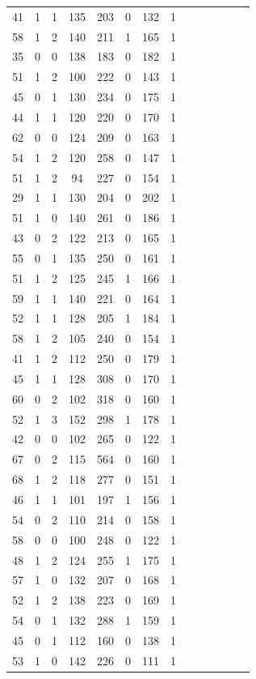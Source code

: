 \documentclass{article}
\begin{document}
\begin{longtable}{|c|c|c|c|c|c|c|c|c|c|c|c|c|c|}
41 & 1 & 1 & 135 & 203 & 0 & 132 & 1\\
58 & 1 & 2 & 140 & 211 & 1 & 165 & 1\\
35 & 0 & 0 & 138 & 183 & 0 & 182 & 1\\
51 & 1 & 2 & 100 & 222 & 0 & 143 & 1\\
45 & 0 & 1 & 130 & 234 & 0 & 175 & 1\\
44 & 1 & 1 & 120 & 220 & 0 & 170 & 1\\
62 & 0 & 0 & 124 & 209 & 0 & 163 & 1\\
54 & 1 & 2 & 120 & 258 & 0 & 147 & 1\\
51 & 1 & 2 & 94 & 227 & 0 & 154 & 1\\
29 & 1 & 1 & 130 & 204 & 0 & 202 & 1\\
51 & 1 & 0 & 140 & 261 & 0 & 186 & 1\\
43 & 0 & 2 & 122 & 213 & 0 & 165 & 1\\
55 & 0 & 1 & 135 & 250 & 0 & 161 & 1\\
51 & 1 & 2 & 125 & 245 & 1 & 166 & 1\\
59 & 1 & 1 & 140 & 221 & 0 & 164 & 1\\
52 & 1 & 1 & 128 & 205 & 1 & 184 & 1\\
58 & 1 & 2 & 105 & 240 & 0 & 154 & 1\\
41 & 1 & 2 & 112 & 250 & 0 & 179 & 1\\
45 & 1 & 1 & 128 & 308 & 0 & 170 & 1\\
60 & 0 & 2 & 102 & 318 & 0 & 160 & 1\\
52 & 1 & 3 & 152 & 298 & 1 & 178 & 1\\
42 & 0 & 0 & 102 & 265 & 0 & 122 & 1\\
67 & 0 & 2 & 115 & 564 & 0 & 160 & 1\\
68 & 1 & 2 & 118 & 277 & 0 & 151 & 1\\
46 & 1 & 1 & 101 & 197 & 1 & 156 & 1\\
54 & 0 & 2 & 110 & 214 & 0 & 158 & 1\\
58 & 0 & 0 & 100 & 248 & 0 & 122 & 1\\
48 & 1 & 2 & 124 & 255 & 1 & 175 & 1\\
57 & 1 & 0 & 132 & 207 & 0 & 168 & 1\\
52 & 1 & 2 & 138 & 223 & 0 & 169 & 1\\
54 & 0 & 1 & 132 & 288 & 1 & 159 & 1\\
45 & 0 & 1 & 112 & 160 & 0 & 138 & 1\\
53 & 1 & 0 & 142 & 226 & 0 & 111 & 1\\

\end{longtable}
\end{document}
